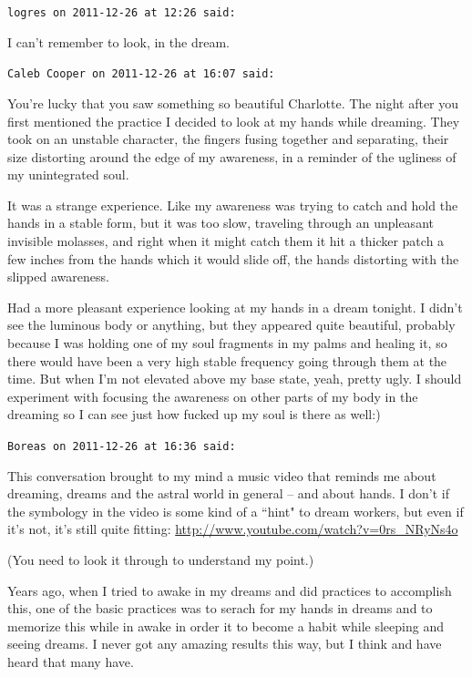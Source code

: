 \begin{footnotesize}
\begin{sffamily}
\hfill

\texttt{logres on 2011-12-26 at 12:26 said: }

I can't remember to look, in the dream.


\hfill

\texttt{Caleb Cooper on 2011-12-26 at 16:07 said: }

You're lucky that you saw something so beautiful Charlotte. The night after you first mentioned the practice I decided to look at my hands while dreaming. They took on an unstable character, the fingers fusing together and separating, their size distorting around the edge of my awareness, in a reminder of the ugliness of my unintegrated soul. 

It was a strange experience. Like my awareness was trying to catch and hold the hands in a stable form, but it was too slow, traveling through an unpleasant invisible molasses, and right when it might catch them it hit a thicker patch a few inches from the hands which it would slide off, the hands distorting with the slipped awareness. 

Had a more pleasant experience looking at my hands in a dream tonight. I didn't see the luminous body or anything, but they appeared quite beautiful, probably because I was holding one of my soul fragments in my palms and healing it, so there would have been a very high stable frequency going through them at the time. But when I'm not elevated above my base state, yeah, pretty ugly. I should experiment with focusing the awareness on other parts of my body in the dreaming so I can see just how fucked up my soul is there as well:)


\hfill

\texttt{Boreas on 2011-12-26 at 16:36 said: }

This conversation brought to my mind a music video that reminds me about dreaming, dreams and the astral world in general – and about hands. I don't if the symbology in the video is some kind of a ``hint" to dream workers, but even if it's not, it's still quite fitting: \url{http://www.youtube.com/watch?v=0rs\_NRyNs4o}

(You need to look it through to understand my point.)

Years ago, when I tried to awake in my dreams and did practices to accomplish this, one of the basic practices was to serach for my hands in dreams and to memorize this while in awake in order it to become a habit while sleeping and seeing dreams. I never got any amazing results this way, but I think and have heard that many have.


\end{sffamily}
\end{footnotesize}
